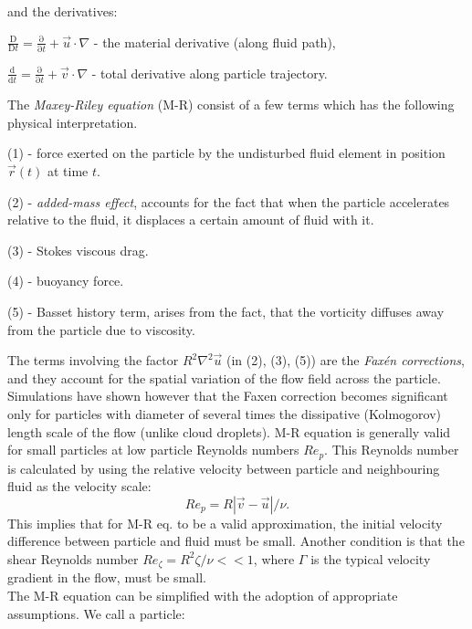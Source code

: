 \documentclass[../main.tex]{subfiles}
\begin{document}
and the derivatives:
\begin{description}
\item $\frac{\mathrm{D}}{\mathrm{D}t}=\frac{\mathrm{\partial}}{\mathrm{\partial}t}+\vec{u} \cdot \nabla$ - the material derivative (along fluid path), 
\item $\frac{\mathrm{d}}{\mathrm{d}t}=\frac{\mathrm{\partial}}{\mathrm{\partial}t}+\vec{v} \cdot \nabla$ - total derivative along particle trajectory.
\end{description}

The \emph{Maxey-Riley equation} (M-R) consist of a few terms which has the following physical interpretation.
\begin{description}
\item (1) - force exerted on the particle by the undisturbed fluid element in position $\vec{r}(t)$ at time $t$.
\item (2) - \emph{added-mass effect}, accounts for the fact that when the particle accelerates relative to the fluid, it displaces a certain amount of fluid with it.
\item (3) - Stokes viscous drag.
\item (4) - buoyancy force.
\item (5) - Basset history term, arises from the fact, that the vorticity diffuses away from the particle due to viscosity.
\end{description}
The terms involving the factor $R^2 \nabla^2 \vec{u}$ (in (2), (3), (5)) are the \emph{Faxén corrections}, and they account for the spatial variation of the flow field across the particle. Simulations have shown  however \citep{Calzavarini2012} that the Faxen correction becomes significant only for particles with diameter of several times the dissipative (Kolmogorov) length scale of the flow (unlike cloud droplets). M-R equation is generally valid for small particles at low particle Reynolds numbers $Re_p$. This Reynolds number is calculated by using the relative velocity between particle and neighbouring fluid as the velocity scale: 
\begin{equation}
Re_p = R|\vec{v} - \vec{u}|/\nu.
\label{def:Rep}
\end{equation}
This implies that for M-R eq. to be a valid approximation, the initial velocity difference between particle and fluid must be small. Another condition is that the shear Reynolds number $Re_{\zeta} = R^2 \zeta/\nu<<1$, where $\Gamma$ is the typical velocity gradient in the flow, must be small.\\
The M-R equation can be simplified with the adoption of appropriate assumptions. We call a particle:
\end{document}
